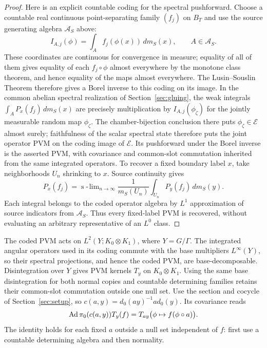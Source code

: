 \begin{proof}
Here is an explicit countable coding for the spectral pushforward.
Choose a countable real continuous point-separating family $(f_j)$ on
$B_T$ and use the source generating algebra $\mathcal A_S$ above:
\[
 I_{A,j}(\phi)=\int_A f_j(\phi(x))\,dm_S(x),
 \qquad A\in\mathcal A_S.
\]
These coordinates are continuous for convergence in measure; equality of
all of them gives equality of each $f_j\circ\phi$ almost everywhere by
the monotone class theorem, and hence equality of the maps almost
everywhere. The Lusin--Souslin Theorem \cite[Corollary~15.2]{Kechris1995} therefore gives a Borel inverse
to this coding on its image. In the common abelian spectral realization
of Section~\ref{sec:gluing}, the weak integrals
$\int_A P_x(f_j)\,dm_S(x)$ are precisely multiplication by
$I_{A,j}(\phi_\zeta)$ for the jointly measurable random map
$\phi_\zeta$. The chamber-bijection conclusion there puts
$\phi_\zeta\in\mathscr E$ almost surely; faithfulness of the scalar
spectral state therefore puts the joint operator PVM on the coding
image of $\mathscr E$. Its pushforward under the Borel inverse is the
asserted PVM, with covariance and common-slot commutation inherited
from the same integrated operators. To recover a fixed boundary label
$x$, take neighborhoods $U_n$ shrinking to $x$. Source continuity gives
\[
 P_x(f_j)=\mathop{\mathrm{s}\!\!\!-\!\lim}_{n\to\infty}
 \frac{1}{m_S(U_n)}\int_{U_n}P_y(f_j)\,dm_S(y).
\]
Each integral belongs to the coded operator algebra by $L^1$
approximation of source indicators from $\mathcal A_S$. Thus every
fixed-label PVM is recovered, without evaluating an arbitrary
representative of an $L^0$ class.
\end{proof}

The coded PVM acts on \(L^2(Y;K_0\otimes K_1)\), where
\(Y=G/\Gamma\).  The integrated angular operators used in its coding
commute with the base multipliers \(L^\infty(Y)\), so their spectral
projections, and hence the coded PVM, are base-decomposable.
Disintegration over \(Y\) gives PVM kernels \(T_y\) on
\(K_0\otimes K_1\).  Using the same base disintegration for both normal
copies and countable determining families retains their common-slot
commutation outside one null set.  Use the section and cocycle of
Section~\ref{sec:setup}, so
\(c(a,y)=d_0(ay)^{-1}a d_0(y)\).  Its covariance reads
\begin{equation}
 \operatorname{Ad}\pi_0(c(a,y))T_y(f)
   =T_{ay}\bigl(\phi\mapsto f(\phi\circ a)\bigr).
 \label{eq:recovery-induced-covariance}
\end{equation}
The identity holds for each fixed \(a\) outside a null set independent of
\(f\): first use a countable determining algebra and then normality.

